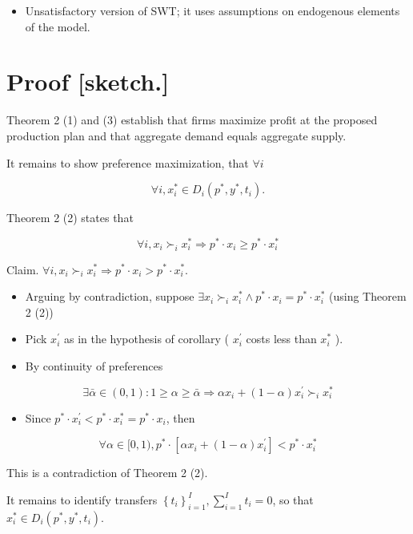 \documentclass[10pt]{article}
\begin{document}
\begin{itemize}
  \item Unsatisfactory version of SWT; it uses assumptions on endogenous elements of the model.
\end{itemize}

\section*{Proof [sketch.]}
Theorem 2 (1) and (3) establish that firms maximize profit at the proposed production plan and that aggregate demand equals aggregate supply.

It remains to show preference maximization, that $\forall i$

$$
\forall i, x_{i}^{*} \in D_{i}\left(p^{*}, y^{*}, t_{i}\right) .
$$

Theorem 2 (2) states that

$$
\forall i, x_{i} \succ_{i} x_{i}^{*} \Longrightarrow p^{*} \cdot x_{i} \geq p^{*} \cdot x_{i}^{*}
$$

Claim. $\forall i, x_{i} \succ_{i} x_{i}^{*} \Longrightarrow p^{*} \cdot x_{i}>p^{*} \cdot x_{i}^{*}$.

\begin{itemize}
  \item Arguing by contradiction, suppose $\exists x_{i} \succ_{i} x_{i}^{*} \wedge p^{*} \cdot x_{i}=p^{*} \cdot x_{i}^{*}$ (using Theorem 2 (2))
  \item Pick $x_{i}^{\prime}$ as in the hypothesis of corollary ( $x_{i}^{\prime}$ costs less than $x_{i}^{*}$ ).
  \item By continuity of preferences
\end{itemize}

$$
\exists \bar{\alpha} \in(0,1): 1 \geq \alpha \geq \bar{\alpha} \Longrightarrow \alpha x_{i}+(1-\alpha) x_{i}^{\prime} \succ_{i} x_{i}^{*}
$$

\begin{itemize}
  \item Since $p^{*} \cdot x_{i}^{\prime}<p^{*} \cdot x_{i}^{*}=p^{*} \cdot x_{i}$, then
\end{itemize}

$$
\forall \alpha \in[0,1), p^{*} \cdot\left[\alpha x_{i}+(1-\alpha) x_{i}^{\prime}\right]<p^{*} \cdot x_{i}^{*}
$$

This is a contradiction of Theorem 2 (2).

It remains to identify transfers $\left\{t_{i}\right\}_{i=1}^{I}, \sum_{i=1}^{I} t_{i}=0$, so that $x_{i}^{*} \in D_{i}\left(p^{*}, y^{*}, t_{i}\right)$.
\end{document}
